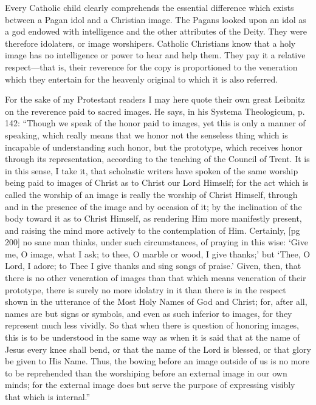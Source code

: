 Every Catholic child clearly comprehends the
essential difference which exists between a Pagan
idol and a Christian image. The Pagans looked
upon an idol as a god endowed with intelligence
and the other attributes of the Deity. They were
therefore idolaters, or image worshipers. Catholic
Christians know that a holy image has no
intelligence or power to hear and help them. They
pay it a relative respect—that is, their reverence
for the copy is proportioned to the veneration
which they entertain for the heavenly original
to which it is also referred.

For the sake of my Protestant readers I may
here quote their own great Leibnitz on the reverence
paid to sacred images. He says, in his Systema
Theologicum, p. 142: “Though we speak of
the honor paid to images, yet this is only a manner
of speaking, which really means that we
honor not the senseless thing which is incapable
of understanding such honor, but the prototype,
which receives honor through its representation,
according to the teaching of the Council of Trent.
It is in this sense, I take it, that scholastic writers
have spoken of the same worship being paid to
images of Christ as to Christ our Lord Himself;
for the act which is called the worship of an
image is really the worship of Christ Himself,
through and in the presence of the image and by
occasion of it; by the inclination of the body toward
it as to Christ Himself, as rendering Him
more manifestly present, and raising the mind
more actively to the contemplation of Him. Certainly,
[pg 200]
no sane man thinks, under such circumstances,
of praying in this wise: ‘Give me, O image,
what I ask; to thee, O marble or wood, I give
thanks;’ but ‘Thee, O Lord, I adore; to Thee I give
thanks and sing songs of praise.’ Given, then, that
there is no other veneration of images than that
which means veneration of their prototype, there is
surely no more idolatry in it than there is in the
respect shown in the utterance of the Most Holy
Names of God and Christ; for, after all, names
are but signs or symbols, and even as such inferior
to images, for they represent much less
vividly. So that when there is question of honoring
images, this is to be understood in the same
way as when it is said that at the name of Jesus
every knee shall bend, or that the name of the
Lord is blessed, or that glory be given to His
Name. Thus, the bowing before an image outside
of us is no more to be reprehended than the
worshiping before an external image in our own
minds; for the external image does but serve the
purpose of expressing visibly that which is internal.”

